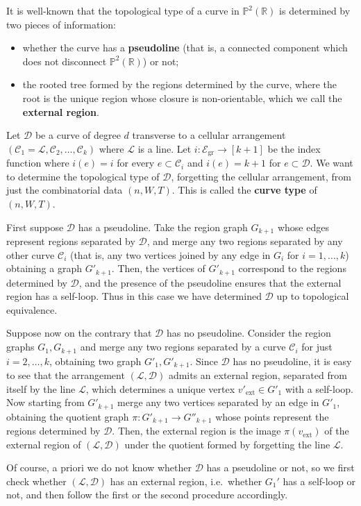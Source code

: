 \documentclass[11pt,reqno]{amsart}
\theoremstyle{plain}
\theoremstyle{definition}
\theoremstyle{remark}
\numberwithin{equation}{subsection}
\newcommand*{\bbP}{\mathbb{P}}
\newcommand*{\bbR}{\mathbb{R}}
\newcommand*{\calC}{\mathcal{C}}
\newcommand*{\calD}{\mathcal{D}}
\newcommand*{\calE}{\mathcal{E}}
\newcommand*{\calL}{\mathcal{L}}
\DeclareMathOperator{\gr}{gr}
\begin{document}
It is well-known \cite{rokhlin1978complex} that the topological type of a curve in $\bbP^2(\bbR)$ is determined by two pieces of information:
\begin{itemize}
    \item whether the curve has a \textbf{pseudoline} (that is, a connected component which does not disconnect $\bbP^2(\bbR)$) or not;
    \item the rooted tree formed by the regions determined by the curve, where the root is the unique region whose closure is non-orientable, which we call the \textbf{external region}.
\end{itemize}
Let $\calD$ be a curve of degree $d$ transverse to a cellular arrangement $(\calC_1=\calL,\calC_2,\dots,\calC_k)$ where $\calL$ is a line. Let $i\colon\calE_{\gr}\to[k+1]$ be the index function where $i(e)=i$ for every $e\subset\calC_i$ and $i(e)=k+1$ for $e\subset\calD$. We want to determine the topological type of $\calD$, forgetting the cellular arrangement, from just the combinatorial data $(n,W,T)$. This is called the \textbf{curve type} of $(n,W,T)$.

First suppose $\calD$ has a pseudoline. Take the region graph $G_{k+1}$ whose edges represent regions separated by $\calD$, and merge any two regions separated by any other curve $\calC_i$ (that is, any two vertices joined by any edge in $G_i$ for $i=1,\dots,k$) obtaining a graph $G'_{k+1}$. Then, the vertices of $G'_{k+1}$ correspond to the regions determined by $\calD$, and the presence of the pseudoline ensures that the external region has a self-loop. Thus in this case we have determined $\calD$ up to topological equivalence.

Suppose now on the contrary that $\calD$ has no pseudoline. Consider the region graphs $G_1,G_{k+1}$ and merge any two regions separated by a curve $\calC_i$ for just $i=2,\dots,k$, obtaining two graph $G'_1,G'_{k+1}$. Since $\calD$ has no pseudoline, it is easy to see that the arrangement $(\calL,\calD)$ admits an external region, separated from itself by the line $\calL$, which determines a unique vertex $v'_{\mathrm{ext}}\in G'_1$ with a self-loop. Now starting from $G'_{k+1}$ merge any two vertices separated by an edge in $G'_1$, obtaining the quotient graph $\pi\colon G'_{k+1}\to G''_{k+1}$ whose points represent the regions determined by $\calD$. Then, the external region is the image $\pi(v_{\textrm{ext}})$ of the external region of $(\calL,\calD)$ under the quotient formed by forgetting the line $\calL$.

Of course, a priori we do not know whether $\calD$ has a pseudoline or not, so we first check whether $(\calL,\calD)$ has an external region, i.e.\ whether $G_1'$ has a self-loop or not, and then follow the first or the second procedure accordingly.
\end{document}
